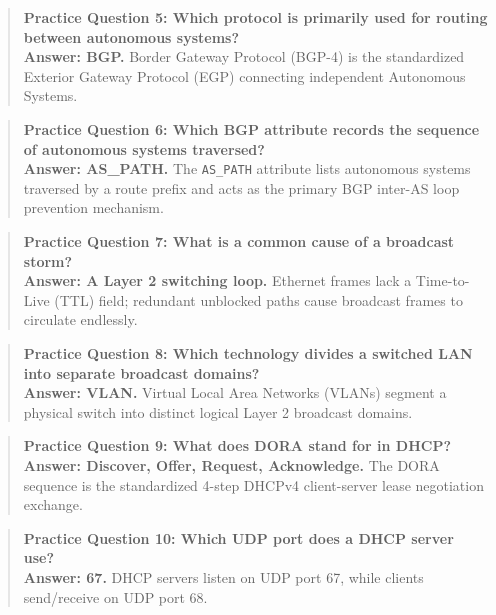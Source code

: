 \begin{quote}
\textbf{Practice Question 5: Which protocol is primarily used for routing between autonomous systems?}\\[4pt]
\vspace{4pt}
\textbf{Answer: BGP.} Border Gateway Protocol (BGP-4) is the standardized Exterior Gateway Protocol (EGP) connecting independent Autonomous Systems.
\end{quote}
\begin{quote}
\textbf{Practice Question 6: Which BGP attribute records the sequence of autonomous systems traversed?}\\[4pt]
\vspace{4pt}
\textbf{Answer: AS\_PATH.} The \texttt{AS\_PATH} attribute lists autonomous systems traversed by a route prefix and acts as the primary BGP inter-AS loop prevention mechanism.
\end{quote}
\begin{quote}
\textbf{Practice Question 7: What is a common cause of a broadcast storm?}\\[4pt]
\vspace{4pt}
\textbf{Answer: A Layer 2 switching loop.} Ethernet frames lack a Time-to-Live (TTL) field; redundant unblocked paths cause broadcast frames to circulate endlessly.
\end{quote}
\begin{quote}
\textbf{Practice Question 8: Which technology divides a switched LAN into separate broadcast domains?}\\[4pt]
\vspace{4pt}
\textbf{Answer: VLAN.} Virtual Local Area Networks (VLANs) segment a physical switch into distinct logical Layer 2 broadcast domains.
\end{quote}
\begin{quote}
\textbf{Practice Question 9: What does DORA stand for in DHCP?}\\[4pt]
\vspace{4pt}
\textbf{Answer: Discover, Offer, Request, Acknowledge.} The DORA sequence is the standardized 4-step DHCPv4 client-server lease negotiation exchange.
\end{quote}
\begin{quote}
\textbf{Practice Question 10: Which UDP port does a DHCP server use?}\\[4pt]
\vspace{4pt}
\textbf{Answer: 67.} DHCP servers listen on UDP port 67, while clients send/receive on UDP port 68.
\end{quote}
